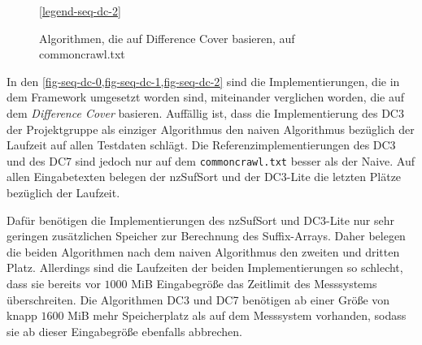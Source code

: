 \begin{figure}[ht]

    \medskip
    \ref{legend-seq-dc-2}
    \caption{Algorithmen, die auf Difference Cover basieren, auf commoncrawl.txt}
    \label{fig-seq-dc-2}
\end{figure}
\FloatBarrier

In  den \cref{fig-seq-dc-0,fig-seq-dc-1,fig-seq-dc-2} sind die Implementierungen, die in dem \sacabench Framework umgesetzt worden sind, miteinander verglichen worden, die auf dem \emph{Difference Cover} basieren. Auffällig ist, dass die Implementierung des DC3 der Projektgruppe als einziger Algorithmus den naiven Algorithmus bezüglich der Laufzeit auf allen Testdaten schlägt. Die Referenzimplementierungen des DC3 und des DC7 sind jedoch nur auf dem \texttt{commoncrawl.txt} besser als der Naive. Auf allen Eingabetexten belegen der nzSufSort und der DC3-Lite die letzten Plätze bezüglich der Laufzeit.

Dafür benötigen die Implementierungen des nzSufSort und DC3-Lite nur sehr geringen zusätzlichen Speicher zur Berechnung des Suffix-Arrays. Daher belegen die beiden Algorithmen nach dem naiven Algorithmus den zweiten und dritten Platz. Allerdings sind die Laufzeiten der beiden Implementierungen so schlecht, dass sie bereits vor $1000$ MiB Eingabegröße das Zeitlimit des Messsystems überschreiten. Die Algorithmen DC3 und DC7 benötigen ab einer Größe von knapp $1600$ MiB mehr Speicherplatz als auf dem Messsystem vorhanden, sodass sie ab dieser Eingabegröße ebenfalls abbrechen.

